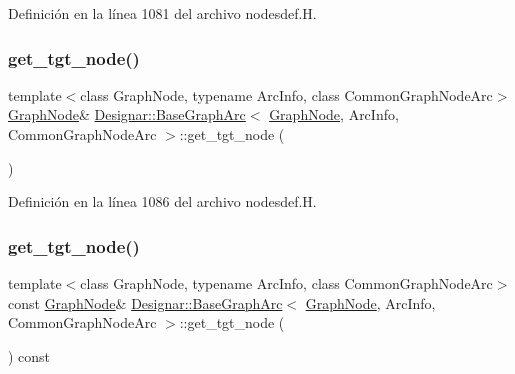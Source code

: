 Definición en la línea 1081 del archivo nodesdef.\+H.

\mbox{\label{class_designar_1_1_base_graph_arc_a2fe944d9d98fd2451d0c82fa0e805bce}} 
\subsubsection{\texorpdfstring{get\+\_\+tgt\+\_\+node()}{get\_tgt\_node()}\hspace{0.1cm}{\footnotesize\ttfamily [1/2]}}
{\footnotesize\ttfamily template$<$class Graph\+Node, typename Arc\+Info, class Common\+Graph\+Node\+Arc$>$ \\
\hyperlink{class_designar_1_1_graph_node}{Graph\+Node}\& \hyperlink{class_designar_1_1_base_graph_arc}{Designar\+::\+Base\+Graph\+Arc}$<$ \hyperlink{class_designar_1_1_graph_node}{Graph\+Node}, Arc\+Info, Common\+Graph\+Node\+Arc $>$\+::get\+\_\+tgt\+\_\+node (\begin{DoxyParamCaption}{ }\end{DoxyParamCaption})\hspace{0.3cm}{\ttfamily [inline]}}



Definición en la línea 1086 del archivo nodesdef.\+H.

\mbox{\label{class_designar_1_1_base_graph_arc_aecf3b0b06c1019563d433d44e922775b}} 
\subsubsection{\texorpdfstring{get\+\_\+tgt\+\_\+node()}{get\_tgt\_node()}\hspace{0.1cm}{\footnotesize\ttfamily [2/2]}}
{\footnotesize\ttfamily template$<$class Graph\+Node, typename Arc\+Info, class Common\+Graph\+Node\+Arc$>$ \\
const \hyperlink{class_designar_1_1_graph_node}{Graph\+Node}\& \hyperlink{class_designar_1_1_base_graph_arc}{Designar\+::\+Base\+Graph\+Arc}$<$ \hyperlink{class_designar_1_1_graph_node}{Graph\+Node}, Arc\+Info, Common\+Graph\+Node\+Arc $>$\+::get\+\_\+tgt\+\_\+node (\begin{DoxyParamCaption}{ }\end{DoxyParamCaption}) const\hspace{0.3cm}{\ttfamily [inline]}}



